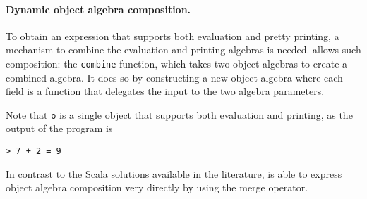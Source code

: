 \paragraph{Dynamic object algebra composition.}
To obtain an expression that supports both evaluation and pretty
printing, a mechanism to combine the evaluation and printing
algebras is needed. \name allows such composition: the \lstinline$combine$
function, which takes two object algebras to create a combined algebra. It
does so by constructing a new object algebra where each field is a
function that delegates the input to the two algebra parameters.
\begin{comment}
  \begin{lstlisting}{language=F2J}
    let combine[A,B](f: ExpAlg[A])(g: ExpAlg[B]) : 
    ExpAlg[A&B] = {
      lit = \(x: Int) -> f.lit x ,, g.lit x,
      add = \(x: A & B) (y: A & B) ->
      f.add x y ,, g.add x y
    }
  \end{lstlisting}
\end{comment}

\begin{comment}
  \begin{lstlisting}{language=F2J}
    let newAlg = 
    combine[IEval,IPrint] subEvalAlg printAlg;
    let o = e1[IEval&IPrint] newAlg;
    o.print ++ " = " ++ o.eval.toString()
  \end{lstlisting}
\end{comment}


Note that \lstinline$o$ is a single object that supports both
evaluation and printing, as the output of the program is
\begin{lstlisting}
> 7 + 2 = 9
\end{lstlisting}

In contrast to the Scala solutions available in the
literature, \name is able to express object algebra
composition very directly by using the merge operator. 